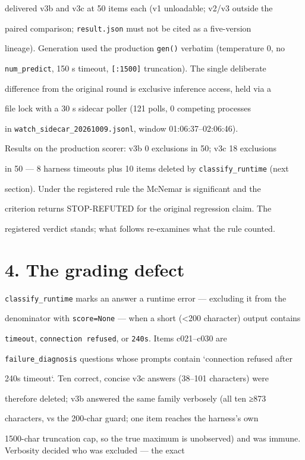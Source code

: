 \documentclass[11pt,a4paper]{article}
\begin{document}
delivered v3b and v3c at 50 items each (v1 unloadable; v2/v3 outside the

paired comparison; \texttt{result.json} must not be cited as a five-version

lineage). Generation used the production \texttt{gen()} verbatim (temperature 0, no

\texttt{num\_predict}, 150 s timeout, \texttt{[:1500]} truncation). The single deliberate

difference from the original round is exclusive inference access, held via a

file lock with a 30 s sidecar poller (121 polls, 0 competing processes

in \texttt{watch\_sidecar\_20261009.jsonl}, window 01:06:37–02:06:46).

Results on the production scorer: v3b 0 exclusions in 50; v3c 18 exclusions

in 50 — 8 harness timeouts plus 10 items deleted by \texttt{classify\_runtime} (next

section). Under the registered rule the McNemar is significant and the

criterion returns STOP-REFUTED for the original regression claim. The

registered verdict stands; what follows re-examines what the rule counted.

\section*{4. The grading defect}
\texttt{classify\_runtime} marks an answer a runtime error — excluding it from the

denominator with \texttt{score=None} — when a short (<200 character) output contains

\texttt{timeout}, \texttt{connection refused}, or \texttt{240s}. Items c021–c030 are

\texttt{failure\_diagnosis} questions whose prompts contain `connection refused after

240s timeout`. Ten correct, concise v3c answers (38–101 characters) were

therefore deleted; v3b answered the same family verbosely (all ten ≥873

characters, vs the 200-char guard; one item reaches the harness's own

1500-char truncation cap, so the true maximum is unobserved) and was immune. Verbosity decided who was excluded — the exact
\end{document}
